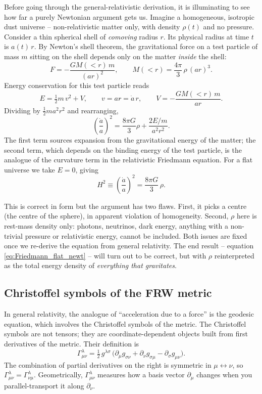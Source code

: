 Before going through the general-relativistic derivation, it is illuminating to see how far a purely Newtonian argument gets us. Imagine a homogeneous, isotropic dust universe -- non-relativistic matter only, with density $\rho(t)$ and no pressure. Consider a thin spherical shell of \emph{comoving} radius $r$. Its physical radius at time $t$ is $a(t)\, r$. By Newton's shell theorem, the gravitational force on a test particle of mass $m$ sitting on the shell depends only on the matter \emph{inside} the shell:
\[
  F = -\frac{G M(<r)\, m}{(a r)^2},
  \qquad
  M(<r) = \frac{4\pi}{3}\, \rho\, (a r)^3.
\]
Energy conservation for this test particle reads
\[
  E = \tfrac{1}{2} m\, v^2 + V,
  \qquad v = a r \dot{} = \dot{a}\, r,
  \qquad V = -\frac{G M(<r)\, m}{a r}.
\]
Dividing by $\tfrac{1}{2} m a^2 r^2$ and rearranging,
\begin{equation}
  \left(\frac{\dot a}{a}\right)^2 = \frac{8\pi G}{3}\rho + \frac{2 E / m}{a^2 r^2}.
  \label{eq:friedmann_newtonian}
\end{equation}
The first term sources expansion from the gravitational energy of the matter; the second term, which depends on the binding energy of the test particle, is the analogue of the curvature term in the relativistic Friedmann equation. For a flat universe we take $E = 0$, giving
\begin{equation}
  H^2 \equiv \left(\frac{\dot a}{a}\right)^2 = \frac{8\pi G}{3}\, \rho.
  \label{eq:Friedmann_flat_newt}
\end{equation}

This is correct in form but the argument has two flaws. First, it picks a centre (the centre of the sphere), in apparent violation of homogeneity. Second, $\rho$ here is rest-mass density only: photons, neutrinos, dark energy, anything with a non-trivial pressure or relativistic energy, cannot be included. Both issues are fixed once we re-derive the equation from general relativity. The end result -- equation \cref{eq:Friedmann_flat_newt} -- will turn out to be correct, but with $\rho$ reinterpreted as the total energy density of \emph{everything that gravitates}.

\subsection{Christoffel symbols of the FRW metric}

In general relativity, the analogue of ``acceleration due to a force'' is the geodesic equation, which involves the Christoffel symbols of the metric. The Christoffel symbols are not tensors; they are coordinate-dependent objects built from first derivatives of the metric. Their definition is
\begin{equation}
  \Gamma^\lambda_{\mu\nu} = \tfrac{1}{2}\, g^{\lambda\sigma}\,\bigl(\partial_\mu g_{\sigma\nu} + \partial_\nu g_{\sigma\mu} - \partial_\sigma g_{\mu\nu}\bigr).
  \label{eq:Christoffel_def}
\end{equation}
The combination of partial derivatives on the right is symmetric in $\mu \leftrightarrow \nu$, so $\Gamma^\lambda_{\mu\nu} = \Gamma^\lambda_{\nu\mu}$. Geometrically, $\Gamma^\lambda_{\mu\nu}$ measures how a basis vector $\partial_\mu$ changes when you parallel-transport it along $\partial_\nu$.


